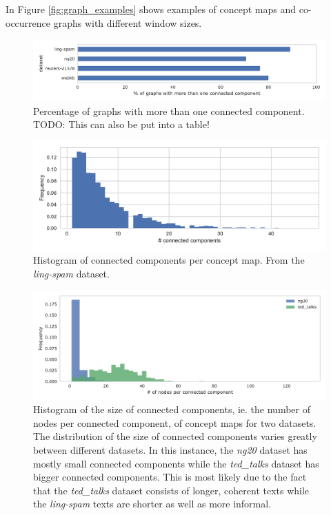 In Figure \ref{fig:graph_examples} shows examples of concept maps and co-occurrence graphs with different window sizes.

\begin{figure}[ht]
\centering
\centering\includegraphics[width=1\linewidth]{assets/figures/percentage_more_than_one_connected_component.pdf}
\caption{Percentage of graphs with more than one connected component. TODO: This can also be put into a table!}\label{fig:percentage_more_than_one_connected_component}
\end{figure}

\begin{figure}[ht]
\centering
\includegraphics[width=0.8\linewidth]{assets/figures/hist-connected-components-ling-spam-CMap.pdf}
\caption{Histogram of connected components per concept map. From the \textit{ling-spam} dataset.}\label{fig:histogram_connected_components}
\end{figure}

\begin{figure}[ht]
	\centering
	\includegraphics[width=0.9\linewidth]{assets/figures/connected_component_size_comparison.pdf}
	\caption{Histogram of the size of connected components, ie. the number of nodes per connected component, of concept maps for two datasets. The distribution of the size of connected components varies greatly between different datasets. In this instance, the \textit{ng20} dataset has mostly small connected components while the \textit{ted\_talks} dataset has bigger connected components. This is most likely due to the fact that the \textit{ted\_talks} dataset consists of longer, coherent texts while the \textit{ling-spam} texts are shorter as well as more informal.}
	\label{fig:histogram_connected_component_size}
\end{figure}


